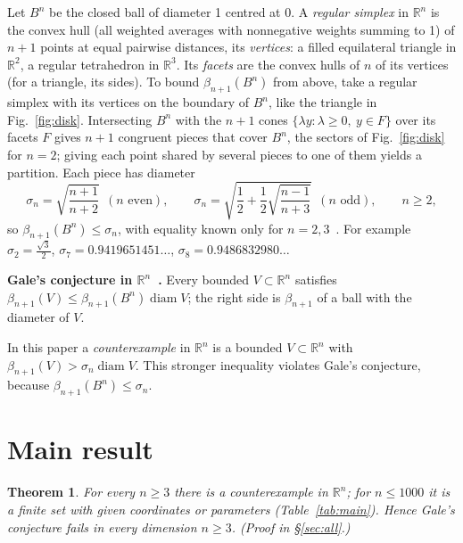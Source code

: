 \documentclass[10pt,a4paper,reqno]{amsart}
\newtheorem{theorem}{Theorem}
\newcommand{\R}{\mathbb R}
\DeclareMathOperator{\diam}{diam}
\begin{document}
Let $B^n$ be the closed ball of diameter 1 centred at $0$. A \emph{regular simplex} in $\R^n$ is the convex hull (all weighted averages with nonnegative weights summing to 1) of $n+1$ points at equal pairwise distances, its \emph{vertices}: a filled equilateral triangle in $\R^2$, a regular tetrahedron in $\R^3$. Its \emph{facets} are the convex hulls of $n$ of its vertices (for a triangle, its sides). To bound $\beta_{n+1}(B^n)$ from above, take a regular simplex with its vertices on the boundary of $B^n$, like the triangle in Fig.~\ref{fig:disk}. Intersecting $B^n$ with the $n+1$ cones $\{\lambda y:\lambda\ge0,\ y\in F\}$ over its facets $F$ gives $n+1$ congruent pieces that cover $B^n$, the sectors of Fig.~\ref{fig:disk} for $n=2$; giving each point shared by several pieces to one of them yields a partition. Each piece has diameter~\cite[\S1]{Vo26}
\begin{equation}\label{eq:sigma}
\sigma_n=\sqrt{\frac{n+1}{n+2}}\ \ (n\text{ even}),\qquad
\sigma_n=\sqrt{\frac12+\frac12\sqrt{\frac{n-1}{n+3}}}\ \ (n\text{ odd}),\qquad n\ge 2,
\end{equation}
so $\beta_{n+1}(B^n)\le\sigma_n$, with equality known only for $n=2,3$~\cite{Vo26}. For example $\sigma_2=\frac{\sqrt3}{2}$, $\sigma_7=0.9419651451\ldots$, $\sigma_8=0.9486832980\ldots$

\smallskip
\noindent\textbf{Gale's conjecture in $\R^n$~\cite{Ga53,Vo26}.} Every bounded $V\subset\R^n$ satisfies $\beta_{n+1}(V)\le\beta_{n+1}(B^n)\diam V$; the right side is $\beta_{n+1}$ of a ball with the diameter of $V$.

\smallskip
\noindent In this paper a \emph{counterexample} in $\R^n$ is a bounded $V\subset\R^n$ with $\beta_{n+1}(V)>\sigma_n\diam V$. This stronger inequality violates Gale's conjecture, because $\beta_{n+1}(B^n)\le\sigma_n$.

\section{Main result}\label{sec:main}

\begin{theorem}\label{thm:main}
For every $n\ge 3$ there is a counterexample in $\R^n$; for $n\le 1000$ it is a finite set with given coordinates or parameters (Table~\ref{tab:main}). Hence Gale's conjecture fails in every dimension $n\ge 3$. \textup{(Proof in \S\ref{sec:all}.)}
\end{theorem}
\end{document}
